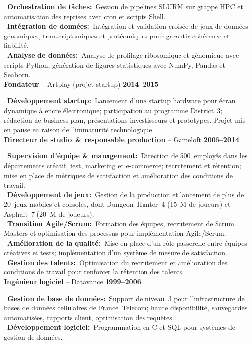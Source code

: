 \documentclass[a4paper,10pt]{article}
\newcommand{\resumeItem}[3]{%
  \noindent\textbf{#1} -- #2 \hfill \textbf{#3} \\
  \vspace{0.3em}
}
\newcommand{\jobItem}[2]{%
  \noindent
  \textbullet\ \textbf{#1\ifthenelse{\boolean{EN}}{}{ }:}~#2\vspace{0.3em} \\
}
\begin{document}
{{    \jobItem{Orchestration de tâches}{Gestion de pipelines SLURM sur grappe HPC et automatisation des reprises avec cron et scripts Shell.}
    \jobItem{Intégration de données}{Intégration et validation croisée de jeux de données génomiques, transcriptomiques et protéomiques pour garantir cohérence et fiabilité.}
    \jobItem{Analyse de données}{Analyse de profilage ribosomique et génomique avec scripts Python; génération de figures statistiques avec NumPy, Pandas et Seaborn.}
    \vspace{1em}
    \resumeItem{Fondateur}{Artplay (projet startup)}{2014–2015}
    \jobItem{Développement startup}{Lancement d'une startup hardware pour écran dynamique à encre électronique; participation au programme District 3; rédaction de business plan, présentations investisseurs et prototypes. Projet mis en pause en raison de l'immaturité technologique.}
    \vspace{1em}
    \resumeItem{Directeur de studio \& responsable production}{Gameloft}{2006–2014}
    \jobItem{Supervision d'équipe \& management}{Direction de 500 employés dans les départements créatif, test, marketing et e-commerce; recrutement et rétention; mise en place de métriques de satisfaction et amélioration des conditions de travail.}
    \jobItem{Développement de jeux}{Gestion de la production et lancement de plus de 20 jeux mobiles et consoles, dont Dungeon Hunter 4 (15 M de joueurs) et Asphalt 7 (20 M de joueurs).}
    \jobItem{Transition Agile/Scrum}{Formation des équipes, recrutement de Scrum Masters et optimisation des processus pour implémentation Agile/Scrum.}
    \jobItem{Amélioration de la qualité}{Mise en place d'un rôle passerelle entre équipes créatives et tests; implémentation d'un système de mesure de satisfaction.}
    \jobItem{Gestion des talents}{Optimisation du recrutement et amélioration des conditions de travail pour renforcer la rétention des talents.}
    \vspace{1em}
    \resumeItem{Ingénieur logiciel}{Datavance}{1999–2006}
    \jobItem{Gestion de base de données}{Support de niveau 3 pour l'infrastructure de bases de données cellulaires de France Telecom; haute disponibilité, sauvegardes automatisées, rapports client, optimisation des requêtes.}
    \jobItem{Développement logiciel}{Programmation en C et SQL pour systèmes de gestion de données.}
  }
}
\end{document}
